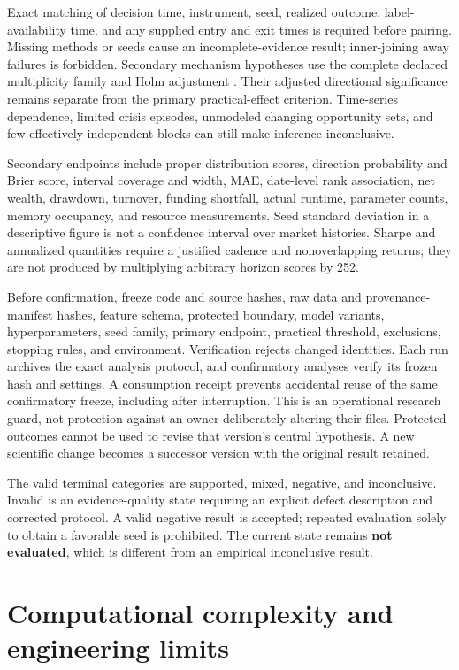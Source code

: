 \documentclass[11pt,a4paper]{article}
\begin{document}
Exact matching of decision time, instrument, seed, realized outcome, label-availability time, and any supplied entry and exit times is required before pairing. Missing methods or seeds cause an incomplete-evidence result; inner-joining away failures is forbidden. Secondary mechanism hypotheses use the complete declared multiplicity family and Holm adjustment \citep{holm1979}. Their adjusted directional significance remains separate from the primary practical-effect criterion. Time-series dependence, limited crisis episodes, unmodeled changing opportunity sets, and few effectively independent blocks can still make inference inconclusive.

Secondary endpoints include proper distribution scores, direction probability and Brier score, interval coverage and width, MAE, date-level rank association, net wealth, drawdown, turnover, funding shortfall, actual runtime, parameter counts, memory occupancy, and resource measurements. Seed standard deviation in a descriptive figure is not a confidence interval over market histories. Sharpe and annualized quantities require a justified cadence and nonoverlapping returns; they are not produced by multiplying arbitrary horizon scores by 252.

Before confirmation, freeze code and source hashes, raw data and provenance-manifest hashes, feature schema, protected boundary, model variants, hyperparameters, seed family, primary endpoint, practical threshold, exclusions, stopping rules, and environment. Verification rejects changed identities. Each run archives the exact analysis protocol, and confirmatory analyses verify its frozen hash and settings. A consumption receipt prevents accidental reuse of the same confirmatory freeze, including after interruption. This is an operational research guard, not protection against an owner deliberately altering their files. Protected outcomes cannot be used to revise that version's central hypothesis. A new scientific change becomes a successor version with the original result retained.

The valid terminal categories are supported, mixed, negative, and inconclusive. Invalid is an evidence-quality state requiring an explicit defect description and corrected protocol. A valid negative result is accepted; repeated evaluation solely to obtain a favorable seed is prohibited. The current state remains \textbf{not evaluated}, which is different from an empirical inconclusive result.

\section{Computational complexity and engineering limits}
\end{document}
